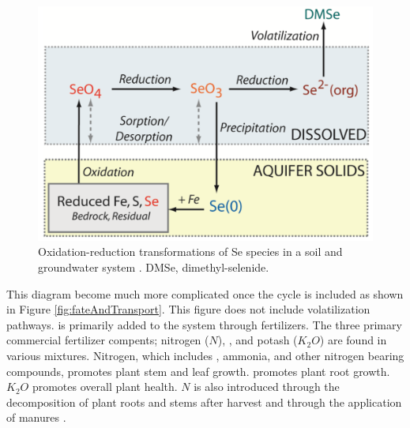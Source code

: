 \begin{linenumbers}[1]
\begin{figure}[htbp]
	\centering
	\includegraphics[scale=.6]{"Figures/SeRedOx"}
	\caption[Oxidation-reduction transformations of Se species in a soil and groundwater system.]{Oxidation-reduction transformations of Se species in a soil and groundwater system  \parencite{Bailey2012}.  DMSe, dimethyl-selenide.}
	\label{fig:SeRedOx}
\end{figure}

This diagram become much more complicated once the \nitrate cycle is included as shown in Figure \ref{fig:fateAndTransport}.  This figure does not include volatilization pathways.  \nitrate is primarily added to the system through fertilizers.  The three primary commercial fertilizer compents; nitrogen ($N$), \phosphate, and potash ($K_2O$) are found in various mixtures.  Nitrogen, which includes \nitrate, ammonia, and other nitrogen bearing compounds, promotes plant stem and leaf growth. \phosphate promotes plant root growth.  $K_2O$ promotes overall plant health.  $N$ is also introduced through the decomposition of plant roots and stems after harvest and through the application of manures \parencite{Bailey2012}. 


\end{linenumbers}
